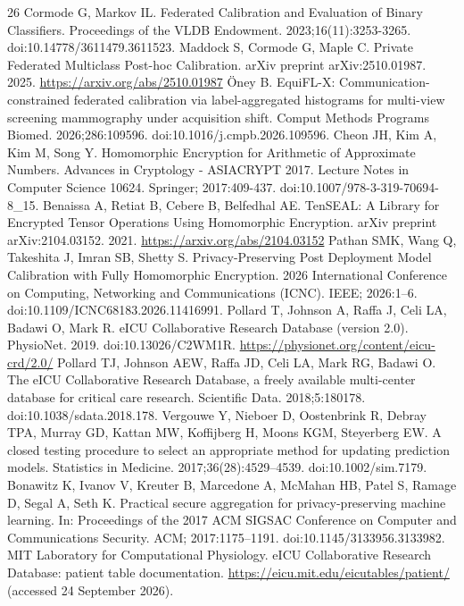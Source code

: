 \documentclass[11pt]{article}
\begin{document}
\begin{thebibliography}{26}
 Cormode G, Markov IL. Federated Calibration and Evaluation of Binary Classifiers. Proceedings of the VLDB Endowment. 2023;16(11):3253-3265. doi:10.14778/3611479.3611523.
 Maddock S, Cormode G, Maple C. Private Federated Multiclass Post-hoc Calibration. arXiv preprint arXiv:2510.01987. 2025. \url{https://arxiv.org/abs/2510.01987}
 {\"O}ney B. EquiFL-X: Communication-constrained federated calibration via label-aggregated histograms for multi-view screening mammography under acquisition shift. Comput Methods Programs Biomed. 2026;286:109596. doi:10.1016/j.cmpb.2026.109596.
 Cheon JH, Kim A, Kim M, Song Y. Homomorphic Encryption for Arithmetic of Approximate Numbers. Advances in Cryptology - ASIACRYPT 2017. Lecture Notes in Computer Science 10624. Springer; 2017:409-437. doi:10.1007/978-3-319-70694-8\_15.
 Benaissa A, Retiat B, Cebere B, Belfedhal AE. TenSEAL: A Library for Encrypted Tensor Operations Using Homomorphic Encryption. arXiv preprint arXiv:2104.03152. 2021. \url{https://arxiv.org/abs/2104.03152}
 Pathan SMK, Wang Q, Takeshita J, Imran SB, Shetty S. Privacy-Preserving Post Deployment Model Calibration with Fully Homomorphic Encryption. 2026 International Conference on Computing, Networking and Communications (ICNC). IEEE; 2026:1--6. doi:10.1109/ICNC68183.2026.11416991.
 Pollard T, Johnson A, Raffa J, Celi LA, Badawi O, Mark R. eICU Collaborative Research Database (version 2.0). PhysioNet. 2019. doi:10.13026/C2WM1R. \url{https://physionet.org/content/eicu-crd/2.0/}
 Pollard TJ, Johnson AEW, Raffa JD, Celi LA, Mark RG, Badawi O. The eICU Collaborative Research Database, a freely available multi-center database for critical care research. Scientific Data. 2018;5:180178. doi:10.1038/sdata.2018.178.
 Vergouwe Y, Nieboer D, Oostenbrink R, Debray TPA, Murray GD, Kattan MW, Koffijberg H, Moons KGM, Steyerberg EW. A closed testing procedure to select an appropriate method for updating prediction models. Statistics in Medicine. 2017;36(28):4529--4539. doi:10.1002/sim.7179.
 Bonawitz K, Ivanov V, Kreuter B, Marcedone A, McMahan HB, Patel S, Ramage D, Segal A, Seth K. Practical secure aggregation for privacy-preserving machine learning. In: Proceedings of the 2017 ACM SIGSAC Conference on Computer and Communications Security. ACM; 2017:1175--1191. doi:10.1145/3133956.3133982.
 MIT Laboratory for Computational Physiology. eICU Collaborative Research Database: patient table documentation. \url{https://eicu.mit.edu/eicutables/patient/} (accessed 24 September 2026).

\end{thebibliography}
\end{document}
